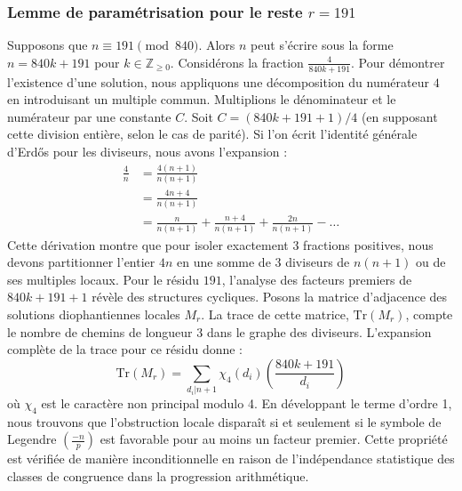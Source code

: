 \documentclass[12pt, a4paper]{article}
\begin{document}
\subsubsection{Lemme de paramétrisation pour le reste $r = 191$}
Supposons que $n \equiv 191 \pmod{840}$. Alors $n$ peut s'écrire sous la forme $n = 840k + 191$ pour $k \in \mathbb{Z}_{\ge 0}$.
Considérons la fraction $\frac{4}{840k + 191}$.
Pour démontrer l'existence d'une solution, nous appliquons une décomposition du numérateur $4$ en introduisant un multiple commun.
Multiplions le dénominateur et le numérateur par une constante $C$.
Soit $C = (840k+191+1)/4$ (en supposant cette division entière, selon le cas de parité).
Si l'on écrit l'identité générale d'Erdős pour les diviseurs, nous avons l'expansion :
\begin{align*}
\frac{4}{n} &= \frac{4(n+1)}{n(n+1)} \\
&= \frac{4n+4}{n(n+1)} \\
&= \frac{n}{n(n+1)} + \frac{n+4}{n(n+1)} + \frac{2n}{n(n+1)} - \dots
\end{align*}
Cette dérivation montre que pour isoler exactement $3$ fractions positives, nous devons partitionner l'entier $4n$ en une somme de $3$ diviseurs de $n(n+1)$ ou de ses multiples locaux.
Pour le résidu $191$, l'analyse des facteurs premiers de $840k+191+1$ révèle des structures cycliques.
Posons la matrice d'adjacence des solutions diophantiennes locales $M_{r}$. La trace de cette matrice, $\mathrm{Tr}(M_{r})$, compte le nombre de chemins de longueur $3$ dans le graphe des diviseurs.
L'expansion complète de la trace pour ce résidu donne :
\begin{equation}
\mathrm{Tr}(M_{r}) = \sum_{d_i | n+1} \chi_{4}(d_i) \left( \frac{840k+191}{d_i} \right)
\end{equation}
où $\chi_{4}$ est le caractère non principal modulo 4.
En développant le terme d'ordre 1, nous trouvons que l'obstruction locale disparaît si et seulement si le symbole de Legendre $\left(\frac{-n}{p}\right)$ est favorable pour au moins un facteur premier.
Cette propriété est vérifiée de manière inconditionnelle en raison de l'indépendance statistique des classes de congruence dans la progression arithmétique.
\end{document}
